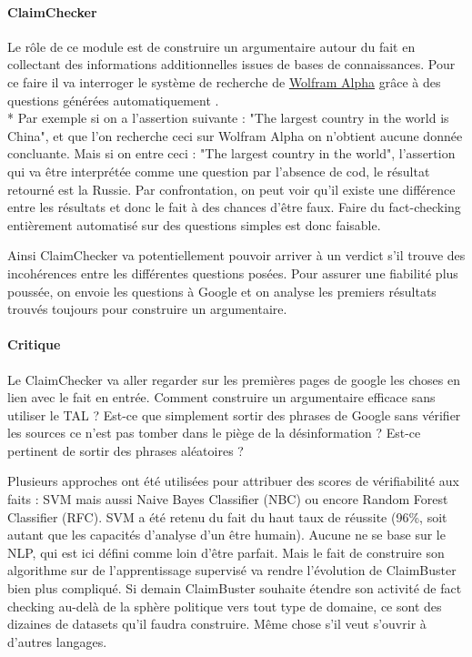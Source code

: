 \documentclass[12pt]{article}
\begin{document}
\paragraph{ClaimChecker}

Le rôle de ce module est de construire un argumentaire autour du fait en collectant des informations additionnelles issues de bases de connaissances. Pour ce faire il va interroger le système de recherche de \href{https://www.wolframalpha.com/about.html}{Wolfram Alpha} grâce à des questions générées automatiquement \cite{heilman2009question}. 
\\*
Par exemple si on a l'assertion suivante : "The largest country in the world is China", et que l'on recherche ceci sur Wolfram Alpha on n'obtient aucune donnée concluante. Mais si on entre ceci : "The largest country in the world", l'assertion qui va être interprétée comme une question par l'absence de cod, le résultat retourné est la Russie. Par confrontation, on peut voir qu'il existe une différence entre les résultats et donc le fait à des chances d'être faux. Faire du fact-checking entièrement automatisé sur des questions simples est donc faisable.

Ainsi ClaimChecker va potentiellement pouvoir arriver à un verdict s'il trouve des incohérences entre les différentes questions posées. Pour assurer une fiabilité plus poussée, on envoie les questions à Google et on analyse les premiers résultats trouvés toujours pour construire un argumentaire.

\paragraph{Critique}

Le ClaimChecker va aller regarder sur les premières pages de google les choses en lien avec le fait en entrée. Comment construire un argumentaire efficace sans utiliser le TAL ? Est-ce que simplement sortir des phrases de Google sans vérifier les sources ce n'est pas tomber dans le piège de la désinformation ? Est-ce pertinent de sortir des phrases aléatoires ?

Plusieurs approches ont été utilisées pour attribuer des scores de vérifiabilité aux faits : SVM mais aussi Naive Bayes Classifier (NBC) ou encore Random Forest Classifier (RFC). SVM a été retenu du fait du haut taux de réussite (96\%, soit autant que les capacités d'analyse d'un être humain). Aucune ne se base sur le NLP, qui est ici défini comme loin d'être parfait. Mais le fait de construire son algorithme sur de l'apprentissage supervisé va rendre l'évolution de ClaimBuster bien plus compliqué. Si demain ClaimBuster souhaite étendre son activité de fact checking au-delà de la sphère politique vers tout type de domaine, ce sont des dizaines de datasets qu'il faudra construire. Même chose s'il veut s'ouvrir à d'autres langages.
\end{document}
